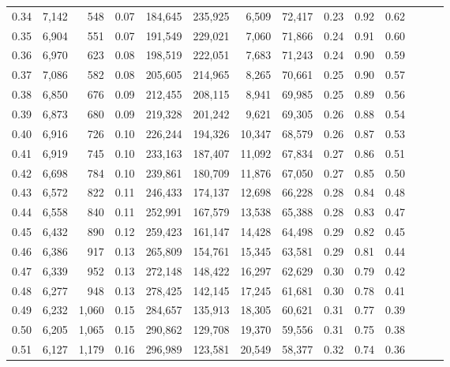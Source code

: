 \begin{tabular}{rrrrrrrrrrrrrr}
0.34 &   7,142 &    548 &  0.07 &  184,645 &  235,925 &   6,509 &  72,417 &  0.23 &  0.92 &      0.62 \\
0.35 &   6,904 &    551 &  0.07 &  191,549 &  229,021 &   7,060 &  71,866 &  0.24 &  0.91 &      0.60 \\
0.36 &   6,970 &    623 &  0.08 &  198,519 &  222,051 &   7,683 &  71,243 &  0.24 &  0.90 &      0.59 \\
0.37 &   7,086 &    582 &  0.08 &  205,605 &  214,965 &   8,265 &  70,661 &  0.25 &  0.90 &      0.57 \\
0.38 &   6,850 &    676 &  0.09 &  212,455 &  208,115 &   8,941 &  69,985 &  0.25 &  0.89 &      0.56 \\
0.39 &   6,873 &    680 &  0.09 &  219,328 &  201,242 &   9,621 &  69,305 &  0.26 &  0.88 &      0.54 \\
0.40 &   6,916 &    726 &  0.10 &  226,244 &  194,326 &  10,347 &  68,579 &  0.26 &  0.87 &      0.53 \\
0.41 &   6,919 &    745 &  0.10 &  233,163 &  187,407 &  11,092 &  67,834 &  0.27 &  0.86 &      0.51 \\
0.42 &   6,698 &    784 &  0.10 &  239,861 &  180,709 &  11,876 &  67,050 &  0.27 &  0.85 &      0.50 \\
0.43 &   6,572 &    822 &  0.11 &  246,433 &  174,137 &  12,698 &  66,228 &  0.28 &  0.84 &      0.48 \\
0.44 &   6,558 &    840 &  0.11 &  252,991 &  167,579 &  13,538 &  65,388 &  0.28 &  0.83 &      0.47 \\
0.45 &   6,432 &    890 &  0.12 &  259,423 &  161,147 &  14,428 &  64,498 &  0.29 &  0.82 &      0.45 \\
0.46 &   6,386 &    917 &  0.13 &  265,809 &  154,761 &  15,345 &  63,581 &  0.29 &  0.81 &      0.44 \\
0.47 &   6,339 &    952 &  0.13 &  272,148 &  148,422 &  16,297 &  62,629 &  0.30 &  0.79 &      0.42 \\
0.48 &   6,277 &    948 &  0.13 &  278,425 &  142,145 &  17,245 &  61,681 &  0.30 &  0.78 &      0.41 \\
0.49 &   6,232 &  1,060 &  0.15 &  284,657 &  135,913 &  18,305 &  60,621 &  0.31 &  0.77 &      0.39 \\
0.50 &   6,205 &  1,065 &  0.15 &  290,862 &  129,708 &  19,370 &  59,556 &  0.31 &  0.75 &      0.38 \\
0.51 &   6,127 &  1,179 &  0.16 &  296,989 &  123,581 &  20,549 &  58,377 &  0.32 &  0.74 &      0.36 \\

\end{tabular}
